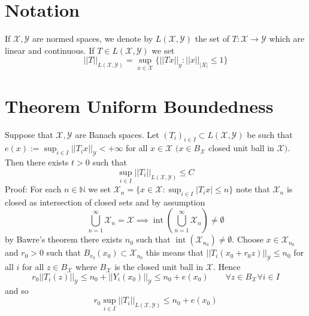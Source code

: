 \documentclass[11pt]{article}
\DeclareMathOperator{\iter}{int}
\begin{document}
\section{Notation}
If $ \mathcal{X}, \mathcal{Y}$ are normed spaces, we denote by $L( \mathcal{X}, \mathcal{Y})$ the set of $ T : \mathcal{X} \rightarrow \mathcal{Y}$ which are linear and continuous. If $T \in L( \mathcal{X}, \mathcal{Y})$ we set
\[
    ||T||_{L( \mathcal{X}, \mathcal{Y})} = \sup_{x \in \mathcal{X}} \{ ||Tx||_y : ||x||_{|X|} \le 1 \}
\] 

\section{Theorem Uniform Boundedness}
Suppose that $ \mathcal{X}, \mathcal{Y}$ are Banach spaces.
Let $(T_i)_{i \in I} \subset L( \mathcal{X}, \mathcal{Y})$  be such that   $e(x) := \sup_{i \in I} ||T_i x||_{ \mathcal{Y}} < +\infty$ for all $x \in \mathcal{X}$ $(x \in B_{ \mathcal{X}}$ closed unit ball in $ \mathcal{X})$.
Then there exists $t > 0$ such that
 \[
     \sup_{i \in I} ||T_i||_{L( \mathcal{X}, \mathcal{Y})} \le C
\] 
Proof: For each $n \in \mathbb{N}$ we set $ \mathcal{X}_n = \{x \in \mathcal{X}: \sup_{i \in I} |T_i x| \le n\}$ note that $ \mathcal{X}_n$ is closed as intersection
of closed sets and by assumption
\[
    \bigcup_{n=1}^{\infty} \mathcal{X}_n = \mathcal{X} \implies \iter( \bigcup_{n=1}^{\infty}  \mathcal{X}_n ) \ne \emptyset
\] 
by Bawre's theorem there exists $n_0$ such that $\iter( \mathcal{X}_{n_0}) \ne \emptyset$. Choose $x \in  \mathcal{X}_{n_0}$ and $r_0 > 0$ such that $B_{r_0}(x_0) \subset \mathcal{X}_{n_0}$ this means that
$||T_i(x_0 + r_0 z)||_{ \mathcal{Y}} \le n_0$  for all $ i$ for all $z \in B_{ \mathcal{X}}$ where  $B_{ \mathcal{X}}$ is the closed unit ball in $ \mathcal{X}$.
Hence 
 \[
     r_0 || T_i(z) ||_{ \mathcal{Y}} \le n_0 + ||Y_i(x_0) ||_{ \mathcal{Y}} \le n_0 + e(x_0) \qquad \forall z \in B_{ \mathcal{X}} \forall i \in I
\] 
and so
\[
    r_0 \sup_{i \in I} ||T_i||_{L( \mathcal{X}, \mathcal{Y})} \le n_0 + e(x_0)
\] 
\end{document}
